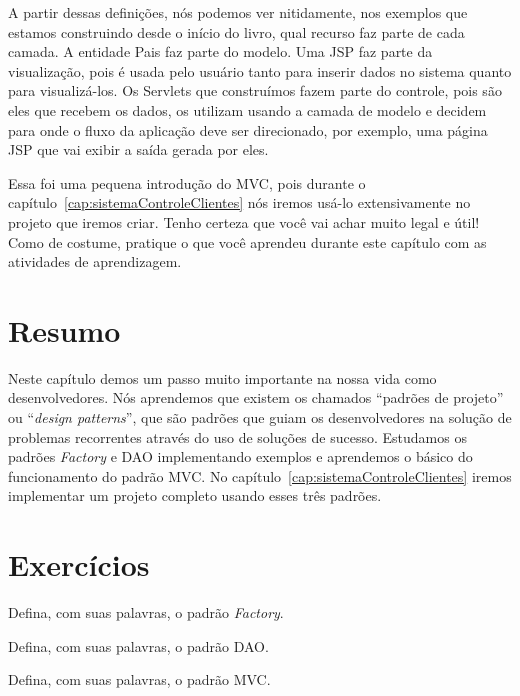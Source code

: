 A partir dessas definições, nós podemos ver nitidamente, nos exemplos que estamos construindo desde o início do livro, qual recurso faz parte de cada camada. A entidade Pais faz parte do modelo. Uma JSP faz parte da visualização, pois é usada pelo usuário tanto para inserir dados no sistema quanto para visualizá-los. Os Servlets que construímos fazem parte do controle, pois são eles que recebem os dados, os utilizam usando a camada de modelo e decidem para onde o fluxo da aplicação deve ser direcionado, por exemplo, uma página JSP que vai exibir a saída gerada por eles.

Essa foi uma pequena introdução do MVC, pois durante o capítulo~\ref{cap:sistemaControleClientes} nós iremos usá-lo extensivamente no projeto que iremos criar. Tenho certeza que você vai achar muito legal e útil! Como de costume, pratique o que você aprendeu durante este capítulo com as atividades de aprendizagem.


\section{Resumo}

Neste capítulo demos um passo muito importante na nossa vida como desenvolvedores. Nós aprendemos que existem os chamados ``padrões de projeto'' ou ``\textit{design patterns}'', que são padrões que guiam os desenvolvedores na solução de problemas recorrentes através do uso de soluções de sucesso. Estudamos os padrões \textit{Factory} e DAO implementando exemplos e aprendemos o básico do funcionamento do padrão MVC. No capítulo~\ref{cap:sistemaControleClientes} iremos implementar um projeto completo usando esses três padrões. 


\section{Exercícios}

\begin{exercicioSemArquivo}{}{}{}
    Defina, com suas palavras, o padrão \textit{Factory}.
\end{exercicioSemArquivo}

\begin{exercicioSemArquivo}{}{}{}
    Defina, com suas palavras, o padrão DAO.
\end{exercicioSemArquivo}

\begin{exercicioSemArquivo}{}{}{}
    Defina, com suas palavras, o padrão MVC.
\end{exercicioSemArquivo}


